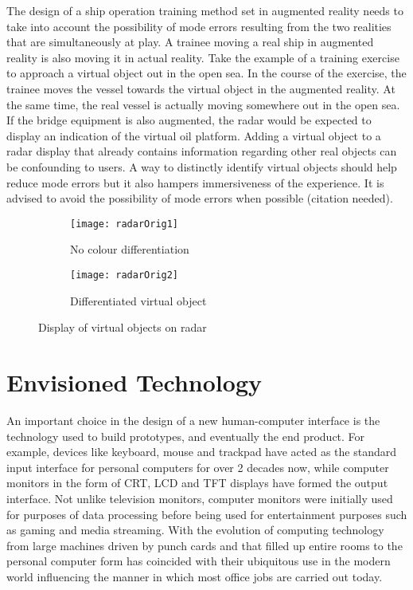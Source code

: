 The design of a ship operation training method set in augmented reality needs to take into account the possibility of mode errors resulting from the two realities that are simultaneously at play. A trainee moving a real ship in augmented reality is also moving it in actual reality. Take the example of a training exercise to approach a virtual object out in the open sea. In the course of the exercise, the trainee moves the vessel towards the virtual object in the augmented reality. At the same time, the real vessel is actually moving somewhere out in the open sea. If the bridge equipment is also augmented, the radar would be expected to display an indication of the virtual oil platform. Adding a virtual object to a radar display that already contains information regarding other real objects can be confounding to users. A way to distinctly identify virtual objects should help reduce mode errors but it also hampers immersiveness of the experience. 
It is advised to avoid the possibility of mode errors when possible (citation needed). 

\begin{figure}[ht]
    \centering
    \begin{subfigure}[b]{0.45\textwidth}
        \centering
        \texttt{[image: radarOrig1]}
        \caption{No colour differentiation}
        \label{fig:three sin x}
    \end{subfigure}
    \hfill
    \begin{subfigure}[b]{0.45\textwidth}
        \centering
        \texttt{[image: radarOrig2]}
        \caption{Differentiated virtual object}
        \label{fig:five over x}
    \end{subfigure}
    \caption{Display of virtual objects on radar}
    \label{fig:three graphs}
\end{figure}

\section{Envisioned Technology}

An important choice in the design of a new human-computer interface is the technology used to build prototypes, and eventually the end product. For example, devices like keyboard, mouse and trackpad have acted as the standard input interface for personal computers for over 2 decades now, while computer monitors in the form of CRT, LCD and TFT displays have formed the output interface. Not unlike television monitors, computer monitors were initially used for purposes of data processing before being used for entertainment purposes such as gaming and media streaming. With the evolution of computing technology from large machines driven by punch cards and that filled up entire rooms to the personal computer form has coincided with their ubiquitous use in the modern world influencing the manner in which most office jobs are carried out today. 

